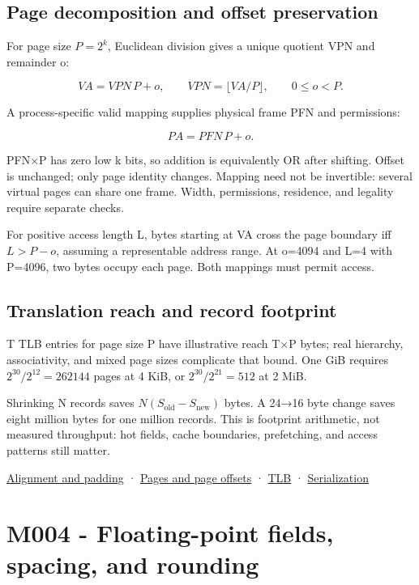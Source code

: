 \subsection{Page decomposition and offset preservation}\label{01-foundations-i-ch011-page-decomposition-and-offset-preservation}

For page size \(P=2^k\), Euclidean division gives a unique quotient VPN and remainder o:

\[
VA=VPN\,P+o,\qquad VPN=\lfloor VA/P\rfloor,\qquad 0\le o<P.
\]

A process-specific valid mapping supplies physical frame PFN and permissions:

\[
PA=PFN\,P+o.
\]

PFN×P has zero low k bits, so addition is equivalently OR after shifting. Offset is unchanged; only page identity changes. Mapping need not be invertible: several virtual pages can share one frame. Width, permissions, residence, and legality require separate checks.

For positive access length L, bytes starting at VA cross the page boundary iff \(L>P-o\), assuming a representable address range. At o=4094 and L=4 with P=4096, two bytes occupy each page. Both mappings must permit access.

\subsection{Translation reach and record footprint}\label{01-foundations-i-ch011-translation-reach-and-record-footprint}

T TLB entries for page size P have illustrative reach T×P bytes; real hierarchy, associativity, and mixed page sizes complicate that bound. One GiB requires \(2^{30}/2^{12}=262144\) pages at 4 KiB, or \(2^{30}/2^{21}=512\) at 2 MiB.

Shrinking N records saves \(N(S_{\mathrm{old}}-S_{\mathrm{new}})\) bytes. A 24→16 byte change saves eight million bytes for one million records. This is footprint arithmetic, not measured throughput: hot fields, cache boundaries, prefetching, and access patterns still matter.

\hyperref[appendix-a1f7c53b4742]{Alignment and padding} · \hyperref[appendix-0c67cd5bf30a]{Pages and page offsets} · \hyperref[appendix-7a2d9c5ce511]{TLB} · \hyperref[appendix-91d09ebed979]{Serialization}

\section{M004 - Floating-point fields, spacing, and rounding}\label{01-foundations-i-ch011-m004---floating-point-fields-spacing-and-rounding}

